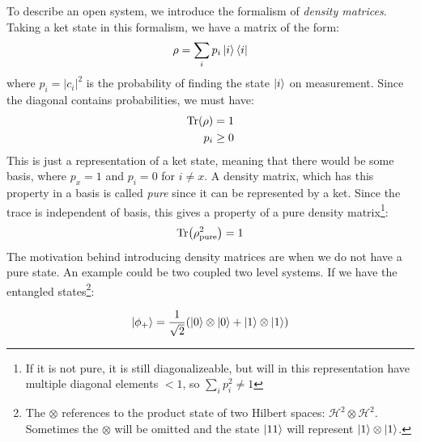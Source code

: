 To describe an open system, we introduce the formalism of \textit{density matrices}. Taking a ket state in this formalism, we have a matrix of the form:
\begin{equation}
    \rho = \sum_i p_i \ket{i}\bra{i}
\end{equation}
where $p_i = |c_i|^2$ is the probability of finding the state $\ket{i}$ on measurement. Since the diagonal contains probabilities, we must have:
\begin{align}
    \Tr(\rho) &= 1 \\
    p_i &\geq 0
\end{align}
This is just a representation of a ket state, meaning that there would be some basis, where $p_x = 1$ and $p_i = 0$ for $i\neq x$. A density matrix, which has this property in a basis is called \textit{pure} since it can be represented by a ket. Since the trace is independent of basis, this gives a property of a pure density matrix\footnote{If it is not pure, it is still diagonalizeable, but will in this representation have multiple diagonal elements $<1$, so $\sum_i p_i^2 \neq 1$}:
\begin{equation}
    \Tr(\rho_{\text{pure}}^2) = 1
\end{equation}
The motivation behind introducing density matrices are when we do not have a pure state. An example could be two coupled two level systems. If we have the entangled states\footnote{The $\otimes$ references to the product state of two Hilbert spaces: $\mathcal{H}^2 \otimes \mathcal{H}^2$. Sometimes the $\otimes$ will be omitted and the state $\ket{1 1}$ will represent $\ket{1} \otimes \ket{1}$.}:

\begin{equation}\label{eq:phi_plus}
    \ket{\phi_+} = \frac{1}{\sqrt{2}}(\ket{0}\otimes \ket{0} + \ket{1}\otimes\ket{1})
\end{equation}

